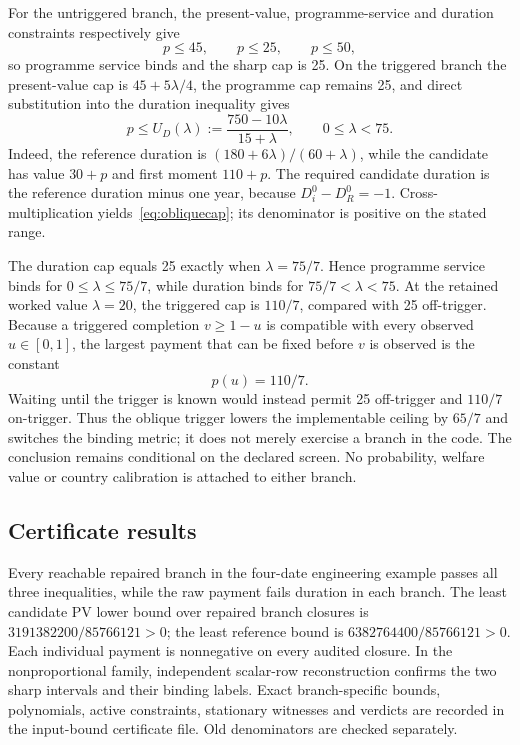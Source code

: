 \documentclass[11pt,a4paper]{article}
\begin{document}
For the untriggered branch, the present-value, programme-service and duration constraints respectively give
\[
 p\leq45,\qquad p\leq25,\qquad p\leq50,
\]
so programme service binds and the sharp cap is 25. On the triggered branch the present-value cap is $45+5\lambda/4$, the programme cap remains 25, and direct substitution into the duration inequality gives
\begin{equation}\label{eq:obliquecap}
 p\leq U_D(\lambda):=\frac{750-10\lambda}{15+\lambda},
 \qquad 0\leq\lambda<75.
\end{equation}
Indeed, the reference duration is $(180+6\lambda)/(60+\lambda)$, while the candidate has value $30+p$ and first moment $110+p$. The required candidate duration is the reference duration minus one year, because $D_i^0-D_R^0=-1$. Cross-multiplication yields~\eqref{eq:obliquecap}; its denominator is positive on the stated range.

The duration cap equals 25 exactly when $\lambda=75/7$. Hence programme service binds for $0\leq\lambda\leq75/7$, while duration binds for $75/7<\lambda<75$. At the retained worked value $\lambda=20$, the triggered cap is $110/7$, compared with 25 off-trigger. Because a triggered completion $v\geq1-u$ is compatible with every observed $u\in[0,1]$, the largest payment that can be fixed before $v$ is observed is the constant
\begin{equation}
 \boxed{p(u)=110/7.}
\end{equation}
Waiting until the trigger is known would instead permit 25 off-trigger and $110/7$ on-trigger. Thus the oblique trigger lowers the implementable ceiling by $65/7$ and switches the binding metric; it does not merely exercise a branch in the code. The conclusion remains conditional on the declared screen. No probability, welfare value or country calibration is attached to either branch.

\subsection{Certificate results}
Every reachable repaired branch in the four-date engineering example passes all three inequalities, while the raw payment fails duration in each branch. The least candidate PV lower bound over repaired branch closures is $3191382200/85766121>0$; the least reference bound is $6382764400/85766121>0$. Each individual payment is nonnegative on every audited closure. In the nonproportional family, independent scalar-row reconstruction confirms the two sharp intervals and their binding labels. Exact branch-specific bounds, polynomials, active constraints, stationary witnesses and verdicts are recorded in the input-bound certificate file. Old denominators are checked separately.
\end{document}
